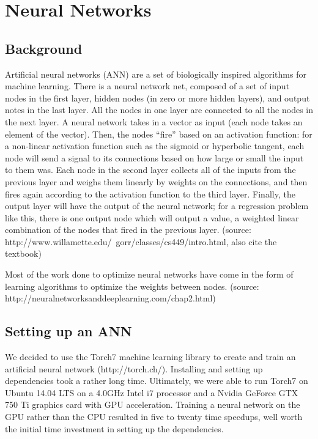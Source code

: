 \documentclass{article}
\begin{document}
\maketitle


\section{Neural Networks}

\subsection{Background}

Artificial neural networks (ANN) are a set of biologically inspired algorithms
for machine learning.  There is a neural network net, composed of a set of input
 nodes in the first layer, hidden nodes (in zero or more hidden layers), and output
  notes in the last layer. All the nodes in one layer are connected to all the nodes 
  in the next layer.  A neural network takes in a vector as input (each node takes an 
  element of the vector).  Then, the nodes “fire” based on an activation function: 
  for a non-linear activation function such as the sigmoid or hyperbolic tangent, 
  each node will send a signal to its connections based on how large or small the 
  input to them was.  Each node in the second layer collects all of the inputs from 
  the previous layer and weighs them linearly by weights on the connections, and then
   fires again according to the activation function to the third layer.  Finally, 
   the output layer will have the output of the neural network; for a regression 
   problem like this, there is one output node which will output a value, a 
   weighted linear combination of the nodes that fired in the previous layer.
(source: http://www.willamette.edu/~gorr/classes/cs449/intro.html, also cite the textbook)

Most of the work done to optimize neural networks have come in the form of
 learning algorithms to optimize the weights between nodes.  
 (source: http://neuralnetworksanddeeplearning.com/chap2.html)

\subsection{Setting up an ANN}

We decided to use the Torch7 machine learning library to create and 
train an artificial neural network (http://torch.ch/).  Installing and
 setting up dependencies took a rather long time.  Ultimately, we were
  able to run Torch7 on Ubuntu 14.04 LTS on a 4.0GHz Intel i7 processor
   and a Nvidia GeForce GTX 750 Ti graphics card with GPU acceleration. 
    Training a neural network on the GPU rather than the CPU resulted in
     five to twenty time speedups, well worth the initial time investment
      in setting up the dependencies.
\end{document}
